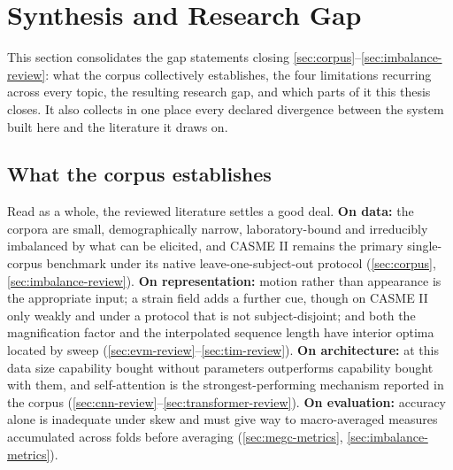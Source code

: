 
\section{Synthesis and Research Gap}
\label{sec:synthesis-and-gap}

This section consolidates the gap statements closing \autoref{sec:corpus}--\autoref{sec:imbalance-review}: what the corpus collectively establishes, the four limitations recurring across every topic, the resulting research gap, and which parts of it this thesis closes. It also collects in one place every declared divergence between the system built here and the literature it draws on.

\subsection{What the corpus establishes}
\label{sec:corpus-establishes}

Read as a whole, the reviewed literature settles a good deal. \textbf{On data:} the corpora are small, demographically narrow, laboratory-bound and irreducibly imbalanced by what can be elicited, and CASME II remains the primary single-corpus benchmark under its native leave-one-subject-out protocol (\autoref{sec:corpus}, \autoref{sec:imbalance-review}). \textbf{On representation:} motion rather than appearance is the appropriate input; a strain field adds a further cue, though on CASME II only weakly and under a protocol that is not subject-disjoint; and both the magnification factor and the interpolated sequence length have interior optima located by sweep (\autoref{sec:evm-review}--\autoref{sec:tim-review}). \textbf{On architecture:} at this data size capability bought without parameters outperforms capability bought with them, and self-attention is the strongest-performing mechanism reported in the corpus (\autoref{sec:cnn-review}--\autoref{sec:transformer-review}). \textbf{On evaluation:} accuracy alone is inadequate under skew and must give way to macro-averaged measures accumulated across folds before averaging (\autoref{sec:megc-metrics}, \autoref{sec:imbalance-metrics}).

